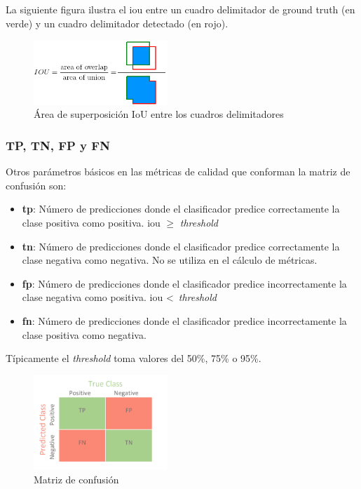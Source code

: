 La siguiente figura ilustra el \gls{iou} entre un cuadro delimitador de ground truth (en verde) y un cuadro delimitador detectado (en rojo).

\begin{figure}[ht]
\centering
\includegraphics[width=0.45\textwidth]{img/chapters/resultados/metricas/iou.png}
\caption{\label{fig:iou}Área de superposición IoU entre los cuadros delimitadores \cite{padillaCITE2020}}
\end{figure}

\subsubsection{TP, TN, FP y FN}
\label{subsubsec:tp+tn+fp+fn}

Otros parámetros básicos en las métricas de calidad que conforman la matriz de confusión \cite{confusion-matrix} son:

\begin{itemize}
    \item \textbf{\gls{tp}}: Número de predicciones donde el clasificador predice correctamente la clase positiva como positiva. \gls{iou} $\geqslant$ \textit{threshold}
    \item \textbf{\gls{tn}}: Número de predicciones donde el clasificador predice correctamente la clase negativa como negativa. No se utiliza en el cálculo de métricas.
    \item \textbf{\gls{fp}}: Número de predicciones donde el clasificador predice incorrectamente la clase negativa como positiva. \gls{iou} <\ \textit{threshold}
    \item \textbf{\gls{fn}}: Número de predicciones donde el clasificador predice incorrectamente la clase positiva como negativa.
\end{itemize}

Típicamente el \textit{threshold} toma valores del 50\%, 75\% o 95\%.

\begin{figure}[ht]
\centering
\includegraphics[width=0.45\textwidth]{img/chapters/resultados/metricas/confusion-matrix.png}
\caption{\label{fig:confusion-matrix}Matriz de confusión \cite{confusion-matrix}}
\end{figure}

